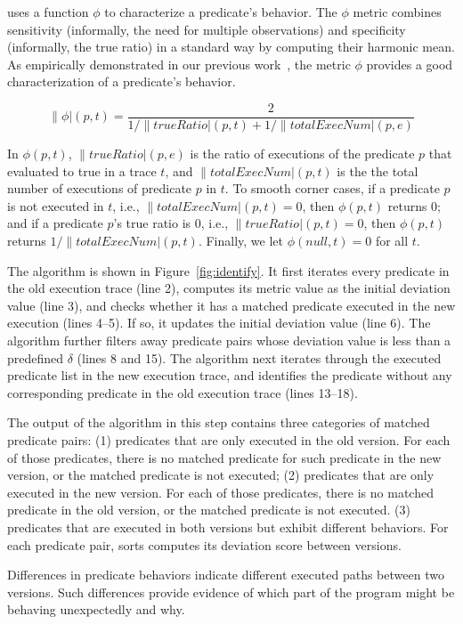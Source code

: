 \ourtool uses a function $\phi$ to characterize a predicate's behavior.
The $\phi$ metric combines sensitivity (informally, the need
for multiple observations) and specificity (informally, the
true ratio) in a standard way by computing their harmonic mean.
As empirically demonstrated in our previous work~\cite{Zhang:2013:ADS},
the metric $\phi$ provides a good characterization of a predicate's behavior.

\vspace{-1mm}

{\small{
\[
\|\phi|(p, t) = \frac{2}{{1}/{\|trueRatio|(p, t)} + {1}/{\|totalExecNum|(p, e)}}
\]
}}

\vspace{-1mm}

In $\phi(p, t)$, $\|trueRatio|(p, e)$ is the ratio of executions of the
predicate $p$ that evaluated to true in a trace $t$,
and $\|totalExecNum|(p, t)$ is the the total
number of executions of predicate $p$ in $t$.
To smooth corner cases, if a predicate $p$ is not executed in $t$, 
i.e., $\|totalExecNum|(p, t) = 0$, then $\phi(p, t)$ returns 0;
and if a predicate $p$'s true ratio is 0, i.e., $\|trueRatio|(p, t) = 0$,
then $\phi(p, t)$ returns $1/\|totalExecNum|(p, t)$.
Finally, we let $\phi(null, t) = 0$ for all $t$.

The algorithm is shown in Figure~\ref{fig:identify}.
It first iterates every predicate in the old execution trace (line 2),
computes its metric value as the initial deviation value (line 3), and
checks whether it has a matched predicate executed in the
new execution (lines 4--5). If so, it updates the
initial deviation value (line 6). The algorithm further filters away
predicate pairs whose deviation value is less than a predefined $\delta$ (lines 8 and 15). The algorithm next iterates through the executed predicate list
in the new execution trace, and identifies the predicate without any
corresponding predicate in the old execution trace (lines 13--18).

The output of the algorithm in this step contains three categories
of matched predicate pairs:
(1) predicates that are only executed in the
old version. For each of those predicates, there is no matched predicate
for such predicate in the new version, or the matched predicate
is not executed; (2) predicates that are only executed
in the new version. For each of those predicates, there is
no matched predicate in the old version, or the matched predicate
is not executed. (3) predicates that
are executed in both versions but exhibit different
behaviors. For each predicate pair, \ourtool sorts computes
its deviation score between versions.


Differences in predicate behaviors indicate different executed paths
between two versions. Such differences provide evidence of
which part of the program might be behaving unexpectedly and why.



